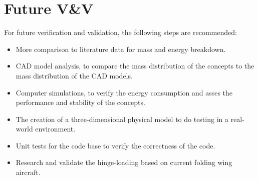 \section{Future V\&V}\label{sec:VVProcedure}
For future verification and validation, the following steps are recommended:
\begin{itemize}
    \item More comparison to literature data for mass and energy breakdown.
    \item CAD model analysis, to compare the mass distribution of the concepts to the mass distribution of the CAD models.
    \item Computer simulations, to verify the energy consumption and asses the performance and stability of the concepts.
    \item The creation of a three-dimensional physical model to do testing in a real-world environment.
    \item Unit tests for the code base to verify the correctness of the code.
    \item Research and validate the hinge-loading based on current folding wing aircraft.
\end{itemize}